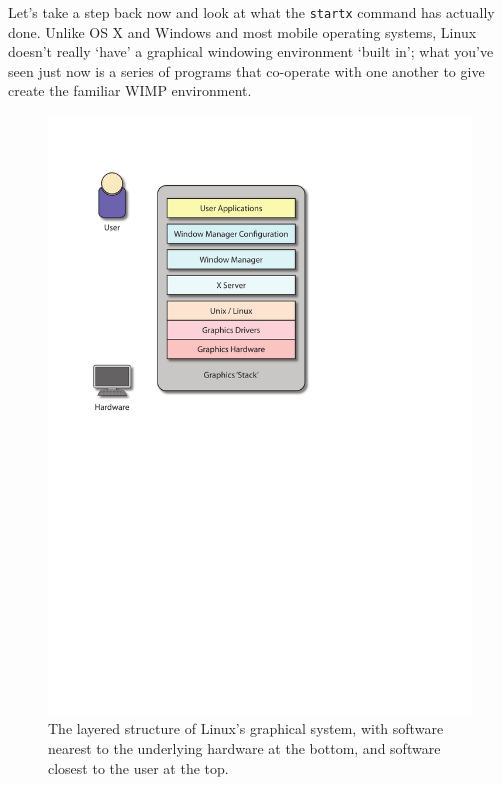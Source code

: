 Let's take a step back now and look at what the \texttt{startx} command has actually done. Unlike OS X and Windows and most mobile operating systems, Linux doesn't really `have' a graphical windowing environment `built in'; what you've seen just now is a series of programs that co-operate with one another to give create the familiar WIMP environment. 

\begin{figure}[htb]
  \begin{center}
    \includegraphics[width=12cm]{images/graphics-stack.pdf}
  \end{center}
\caption{The layered structure of Linux's graphical system, with software nearest to the underlying hardware at the bottom, and software closest to the user at the top.}
\label{figure:Xstructure}
\end{figure}

